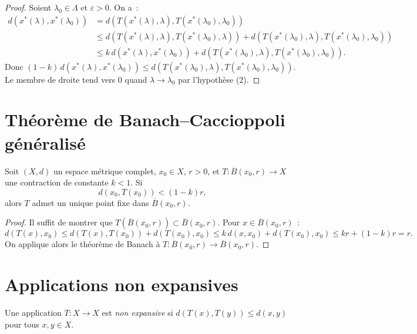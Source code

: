 \begin{proof}
Soient $\lambda_0 \in \Lambda$ et $\varepsilon > 0$. On a~:
\begin{align*}
    d(x^*(\lambda), x^*(\lambda_0))
    &= d(T(x^*(\lambda), \lambda), T(x^*(\lambda_0), \lambda_0)) \\
    &\leq d(T(x^*(\lambda), \lambda), T(x^*(\lambda_0), \lambda))
         + d(T(x^*(\lambda_0), \lambda), T(x^*(\lambda_0), \lambda_0)) \\
    &\leq k \, d(x^*(\lambda), x^*(\lambda_0))
         + d(T(x^*(\lambda_0), \lambda), T(x^*(\lambda_0), \lambda_0)).
\end{align*}
Donc $(1-k) \, d(x^*(\lambda), x^*(\lambda_0)) \leq
d(T(x^*(\lambda_0), \lambda), T(x^*(\lambda_0), \lambda_0))$. Le membre de
droite tend vers $0$ quand $\lambda \to \lambda_0$ par l'hypoth\`ese (2).
\end{proof}

\section{Th\'eor\`eme de Banach--Caccioppoli g\'en\'eralis\'e}

\begin{theoreme}
Soit $(X, d)$ un espace m\'etrique complet, $x_0 \in X$, $r > 0$, et
$T : \overline{B}(x_0, r) \to X$ une contraction de constante $k < 1$. Si
\[
    d(x_0, T(x_0)) < (1 - k) r,
\]
alors $T$ admet un unique point fixe dans $\overline{B}(x_0, r)$.
\end{theoreme}

\begin{proof}
Il suffit de montrer que $T(\overline{B}(x_0, r)) \subset \overline{B}(x_0, r)$.
Pour $x \in \overline{B}(x_0, r)$~:
\[
    d(T(x), x_0) \leq d(T(x), T(x_0)) + d(T(x_0), x_0)
    \leq k \, d(x, x_0) + d(T(x_0), x_0) \leq kr + (1-k)r = r.
\]
On applique alors le th\'eor\`eme de Banach \`a $T : \overline{B}(x_0, r) \to
\overline{B}(x_0, r)$.
\end{proof}

\section{Applications non expansives}

\begin{definition}
Une application $T : X \to X$ est \emph{non expansive} si
$d(T(x), T(y)) \leq d(x, y)$ pour tous $x, y \in X$.
\end{definition}

